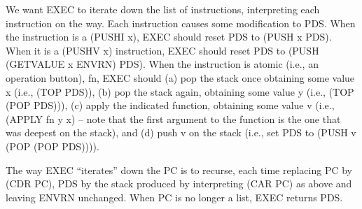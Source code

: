 \documentclass[10pt]{book}
\begin{document}
We want EXEC to iterate down the list of instructions,
interpreting each instruction on the way.  Each instruction causes
some modification to PDS.
When the instruction is a (PUSHI x), EXEC should reset PDS to (PUSH x PDS).
When it is a (PUSHV x) instruction,
EXEC should reset PDS to (PUSH (GETVALUE x ENVRN) PDS).
When the instruction is atomic (i.e., an operation button), fn, EXEC
should (a) pop the stack once obtaining some value x (i.e., (TOP PDS)), (b) pop the stack again, obtaining some value y (i.e.,
(TOP (POP PDS))), (c) apply the indicated function, obtaining some value v
(i.e., (APPLY fn y x) -- note that the first argument to the function is
the one that was deepest on the stack),
and (d) push v on the stack (i.e., set PDS to (PUSH v (POP (POP PDS)))).

The way EXEC ``iterates'' down the PC is to recurse,
each time replacing PC by (CDR PC),  PDS by the stack
produced by
interpreting (CAR PC) as above and
leaving ENVRN unchanged.  When PC is no longer a list, EXEC
returns PDS.
\end{document}
